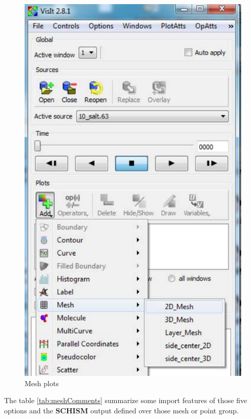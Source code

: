 \documentclass[12pt]{report}
\begin{document}
        \begin{figure}
        \begin{center}
        \includegraphics{meshItems}
        \caption{Mesh plots}
        \label{figure:meshItems}
        \end{center}
        \end{figure}
				
The table \ref{tab:meshComments} summarize some import features of those five options and  the {\bf SCHISM} output
defined over those mesh or point group.
\end{document}
